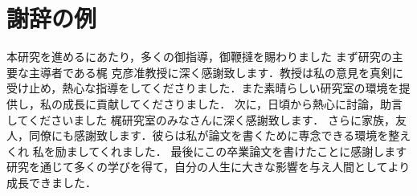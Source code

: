 \chapter*{謝辞の例}

本研究を進めるにあたり，多くの御指導，御鞭撻を賜わりました
まず研究の主要な主導者である梶 克彦准教授に深く感謝致します．教授は私の意見を真剣に受け止め，熱心な指導をしてくださりました．また素晴らしい研究室の環境を提供し，私の成長に貢献してくださりました．
次に，日頃から熱心に討論，助言してくださいました
梶研究室のみなさんに深く感謝致します．
さらに家族，友人，同僚にも感謝致します．彼らは私が論文を書くために専念できる環境を整えくれ
私を励ましてくれました．
最後にこの卒業論文を書けたことに感謝します
研究を通じて多くの学びを得て，自分の人生に大きな影響を与え人間としてより成長できました．







